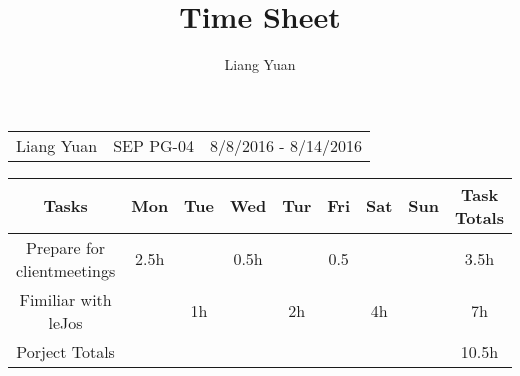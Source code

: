 \documentclass[a4paper]{article}
\title{Time Sheet}
\author{Liang Yuan}
\begin{document}
\maketitle

\begin{table}[h] 
\begin{tabular}{l c r}
Liang Yuan & SEP PG-04 & 8/8/2016 - 8/14/2016    \\
\end{tabular}
\end{table}

\begin{table}[h]
\centering
\begin{tabular}{ccccccccc}\renewcommand{\arraystretch}{4}
Tasks & Mon & Tue & Wed & Tur & Fri & Sat & Sun & Task Totals \\\hline
Prepare for clientmeetings & 2.5h & & 0.5h & & 0.5 & &  & 3.5h \\
Fimiliar with leJos & & 1h & & 2h & & 4h & & 7h\\\hline
Porject Totals & & & & & & & & 10.5h\\\hline

\end{tabular}
\end{table}
\end{document}
